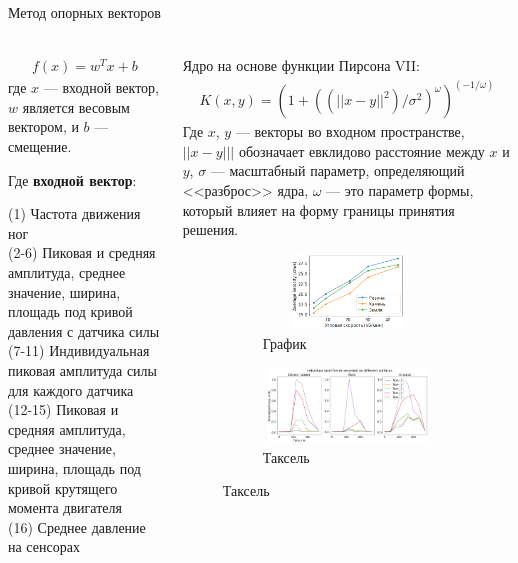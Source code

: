 \begin{frame}[t]{Метод опорных векторов}
\framesubtitle{}
\small
\begin{columns}[T,onlytextwidth]
    \begin{column}{0.49\textwidth}
        \vspace{-0.5cm}
        \begin{align}
            f(x) = w^T x + b
        \end{align}
        где $x$ --- входной вектор, $w$ является весовым вектором, и $b$ --- смещение.

        Где \textbf{входной вектор}:

        (1) Частота движения ног\\
        (2-6) Пиковая и средняя амплитуда, среднее значение, ширина, площадь под кривой давления с датчика силы\\
        (7-11) Индивидуальная пиковая амплитуда силы для каждого датчика\\
        (12-15) Пиковая и средняя амплитуда, среднее значение, ширина, площадь под кривой  крутящего момента двигателя\\
        (16) Среднее давление на сенсорах
    \end{column}
    \begin{column}{0.49\textwidth}
        Ядро на основе функции Пирсона VII:
\begin{align}
    K(x, y) = (1 + ((||x - y||^2)/\sigma^2)^\omega)^{(-1/\omega)}
\end{align}
Где $x$, $y$ --- векторы во входном пространстве, $||x - y|||$ обозначает евклидово расстояние между $x$ и $y$, $\sigma$ --- масштабный параметр, определяющий <<разброс>> ядра, $\omega$ --- это параметр формы, который влияет на форму границы принятия решения.

\begin{figure}[H]
    \begin{subfigure}{0.49\textwidth}
        \centering\includegraphics[height=2cm,width=1\textwidth,keepaspectratio]{../images/s_shape_leg/avg_lin_vel_rev_min.png}
        \caption{График}
    \end{subfigure}
    \begin{subfigure}{0.49\textwidth}
        \centering\includegraphics[height=2cm,width=1\textwidth,keepaspectratio]{../images/s_shape_leg/TaxelIndForce.png}
        \caption{Таксель}
    \end{subfigure}
\end{figure}
    \end{column}
\end{columns}

    
\end{frame}

